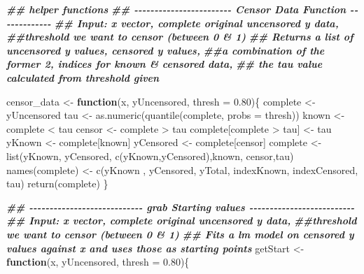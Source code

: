 \documentclass[
]{article}
\newenvironment{Shaded}{\begin{snugshade}}{\end{snugshade}}
\newcommand{\AttributeTok}[1]{\textcolor[rgb]{0.77,0.63,0.00}{#1}}
\newcommand{\ControlFlowTok}[1]{\textcolor[rgb]{0.13,0.29,0.53}{\textbf{#1}}}
\newcommand{\DocumentationTok}[1]{\textcolor[rgb]{0.56,0.35,0.01}{\textbf{\textit{#1}}}}
\newcommand{\FloatTok}[1]{\textcolor[rgb]{0.00,0.00,0.81}{#1}}
\newcommand{\FunctionTok}[1]{\textcolor[rgb]{0.00,0.00,0.00}{#1}}
\newcommand{\NormalTok}[1]{#1}
\newcommand{\OtherTok}[1]{\textcolor[rgb]{0.56,0.35,0.01}{#1}}
\newcommand{\SpecialCharTok}[1]{\textcolor[rgb]{0.00,0.00,0.00}{#1}}
\newcommand{\StringTok}[1]{\textcolor[rgb]{0.31,0.60,0.02}{#1}}
\begin{document}
\begin{Shaded}
\begin{Highlighting}[]
\DocumentationTok{\#\# helper functions}
\DocumentationTok{\#\# {-}{-}{-}{-}{-}{-}{-}{-}{-}{-}{-}{-}{-}{-}{-}{-}{-}{-}{-}{-}{-}{-}{-}{-} Censor Data Function   {-}{-}{-}{-}{-}{-}{-}{-}{-}{-}{-}{-}{-}}
\DocumentationTok{\#\# Input: x vector, complete original uncensored y data, }
\DocumentationTok{\#\#threshold we want to censor (between 0 \& 1)}
\DocumentationTok{\#\# Returns a list of uncensored y values, censored y values, }
\DocumentationTok{\#\#a combination of the former 2, indices for known \& censored data, }
\DocumentationTok{\#\# the tau value calculated from threshold given}

\NormalTok{censor\_data }\OtherTok{\textless{}{-}} \ControlFlowTok{function}\NormalTok{(x, yUncensored, }\AttributeTok{thresh =} \FloatTok{0.80}\NormalTok{)\{}
\NormalTok{  complete }\OtherTok{\textless{}{-}}\NormalTok{ yUncensored}
\NormalTok{  tau }\OtherTok{\textless{}{-}} \FunctionTok{as.numeric}\NormalTok{(}\FunctionTok{quantile}\NormalTok{(complete, }\AttributeTok{probs =}\NormalTok{ thresh))}
\NormalTok{  known }\OtherTok{\textless{}{-}}\NormalTok{ complete }\SpecialCharTok{\textless{}}\NormalTok{ tau}
\NormalTok{  censor }\OtherTok{\textless{}{-}}\NormalTok{ complete }\SpecialCharTok{\textgreater{}}\NormalTok{ tau}
\NormalTok{  complete[complete }\SpecialCharTok{\textgreater{}}\NormalTok{ tau] }\OtherTok{\textless{}{-}}\NormalTok{ tau}
\NormalTok{  yKnown }\OtherTok{\textless{}{-}}\NormalTok{ complete[known]}
\NormalTok{  yCensored }\OtherTok{\textless{}{-}}\NormalTok{ complete[censor] }
\NormalTok{  complete }\OtherTok{\textless{}{-}} \FunctionTok{list}\NormalTok{(yKnown, yCensored, }\FunctionTok{c}\NormalTok{(yKnown,yCensored),known, censor,tau)}
  \FunctionTok{names}\NormalTok{(complete) }\OtherTok{\textless{}{-}} \FunctionTok{c}\NormalTok{(}\StringTok{\textquotesingle{}yKnown\textquotesingle{}}\NormalTok{ , }\StringTok{\textquotesingle{}yCensored\textquotesingle{}}\NormalTok{, }\StringTok{\textquotesingle{}yTotal\textquotesingle{}}\NormalTok{, }\StringTok{\textquotesingle{}indexKnown\textquotesingle{}}\NormalTok{, }\StringTok{\textquotesingle{}indexCensored\textquotesingle{}}\NormalTok{, }\StringTok{\textquotesingle{}tau\textquotesingle{}}\NormalTok{)}
  \FunctionTok{return}\NormalTok{(complete)}
\NormalTok{\}}

\DocumentationTok{\#\# {-}{-}{-}{-}{-}{-}{-}{-}{-}{-}{-}{-}{-}{-}{-}{-}{-}{-}{-}{-}{-}{-}{-}{-}{-}{-}{-}{-} grab Starting values {-}{-}{-}{-}{-}{-}{-}{-}{-}{-}{-}{-}{-}{-}{-}{-}{-}{-}{-}{-}{-}{-}{-}{-}{-}{-}}
\DocumentationTok{\#\# Input: x vector, complete original uncensored y data, }
\DocumentationTok{\#\#threshold we want to censor (between 0 \& 1)}
\DocumentationTok{\#\# Fits a lm model on censored y values against x and uses those as starting points}
\NormalTok{getStart }\OtherTok{\textless{}{-}} \ControlFlowTok{function}\NormalTok{(x, yUncensored, }\AttributeTok{thresh =} \FloatTok{0.80}\NormalTok{)\{}
 

\end{Highlighting}
\end{Shaded}
\end{document}
